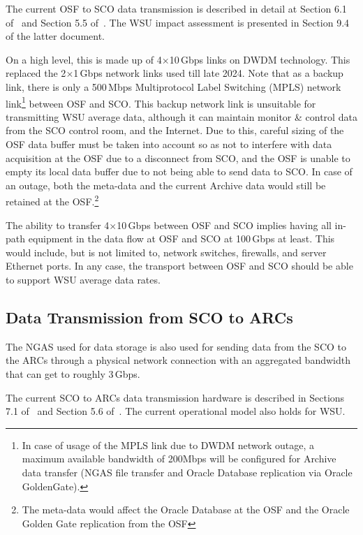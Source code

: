 The current OSF to SCO data transmission is described in detail at Section 6.1 of~\cite{dtas} and Section 5.5 of~\cite{CSA-IA}. The WSU impact assessment is presented in Section 9.4 of the latter document.

On a high level, this is made up of 4$\times$10\,Gbps links on \ac{DWDM} technology. This replaced the 2$\times$1\,Gbps network links used till late 2024. Note that as a backup link, there is only a 500\,Mbps Multiprotocol Label Switching (MPLS) network link\footnote{In case of usage of the MPLS link due to DWDM network outage, a maximum available bandwidth of 200Mbps will be configured for Archive data transfer (NGAS file transfer and Oracle Database replication via Oracle GoldenGate).} between OSF and SCO. This backup network link is unsuitable for transmitting WSU average data, although it can maintain monitor \& control data from the SCO control room, and the Internet. Due to this, careful sizing of the OSF data buffer must be taken into account so as not to interfere with data acquisition at the OSF due to a disconnect from SCO, and the OSF is unable to empty its local data buffer due to not being able to send data to SCO. In case of an outage, both the meta-data and the current Archive data would still be retained at the OSF.\footnote{The meta-data would affect the Oracle Database at the OSF and the Oracle Golden Gate replication from the OSF} 

The ability to transfer 4$\times$10\,Gbps between OSF and SCO implies having all in-path equipment in the data flow at OSF and SCO at 100\,Gbps at least. This would include, but is not limited to, network switches, firewalls, and server Ethernet ports. In any case, the transport between OSF and SCO should be able to support WSU average data rates.


\subsection{Data Transmission from SCO to ARCs} %
\label{ssub:data_transmission_from_sco_to_arcs}
The \ac{NGAS} used for data storage is also used for sending data from the SCO to the ARCs through a physical network connection with an aggregated bandwidth that can get to roughly 3\,Gbps.

The current SCO to ARCs data transmission hardware is described in Sections 7.1 of~\cite{dtas} and Section 5.6 of~\cite{CSA-IA}. The current operational model also holds for WSU.

